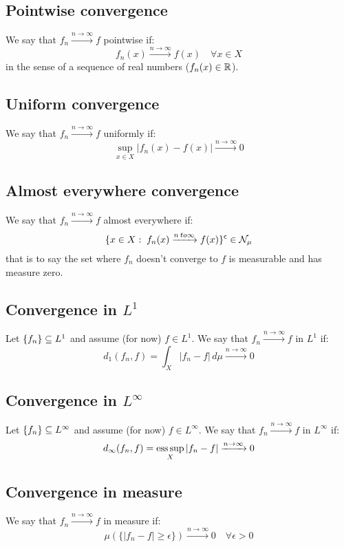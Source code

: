 \subsection{Pointwise convergence}
We say that $f_n \xrightarrow{n\to\infty} f$ pointwise if:
\[
    f_n(x) \xrightarrow{n\to\infty} f(x) \quad \forall x \in X
\]
in the sense of a sequence of real numbers ($f_n(x)\in\R$).

\subsection{Uniform convergence}
We say that $f_n \xrightarrow{n\to\infty} f$ uniformly if:
\[
    \sup_{x\in X} |f_n(x)-f(x)| \xrightarrow{n\to\infty} 0
\]

\subsection{Almost everywhere convergence}
We say that $f_n \xrightarrow{n\to\infty} f$ almost everywhere if:
\[
    \{ x\in X : \; f_n(x) \xrightarrow{n\\to\infty} f(x) \}^\complement \in \mathcal{N}_\mu
\]
that is to say the set where $f_n$ doesn't converge to $f$ is measurable and has measure zero.

\subsection{Convergence in \texorpdfstring{$L^1$}{L1}}
Let $\seq{f}\subseteq L^1$ and assume (for now) $f\in L^1$. We say that $f_n \xrightarrow{n\to\infty} f$ in $L^1$ if:
\[
    d_1(f_n,f) = \int_X |f_n-f| \, d\mu \xrightarrow{n\to\infty} 0    
\]

\subsection{Convergence in \texorpdfstring{$L^\infty$}{Linf}}
Let $\seq{f}\subseteq L^\infty$ and assume (for now) $f\in L^\infty$. We say that $f_n \xrightarrow{n\to\infty} f$ in $L^\infty$ if:
\[
    d_\infty(f_n,f) = \esssup_X |f_n-f| \xrightarrow{n\to\infty} 0
\]

\subsection{Convergence in measure}
We say that $f_n \xrightarrow{n\to\infty} f$ in measure if:
\[
    \mu (\{ |f_n-f| \geq \epsilon \}) \xrightarrow{n\to\infty} 0 \quad \forall \epsilon > 0   
\]
